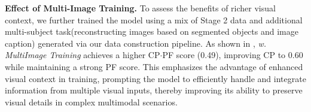 \textbf{Effect of Multi-Image Training.}
To assess the benefits of richer visual context, we further trained the model using a mix of Stage 2 data and additional multi-subject task(reconstructing images based on segmented objects and image caption) generated via our data construction pipeline. As shown in , \textit{w. MultiImage Training} achieves a higher CP$\cdotp$PF score (0.49), improving CP to 0.60 while maintaining a strong PF score.
This emphasizes the advantage of enhanced visual context in training, prompting the model to efficiently handle and integrate information from multiple visual inputs, thereby improving its ability to preserve visual details in complex multimodal scenarios.






